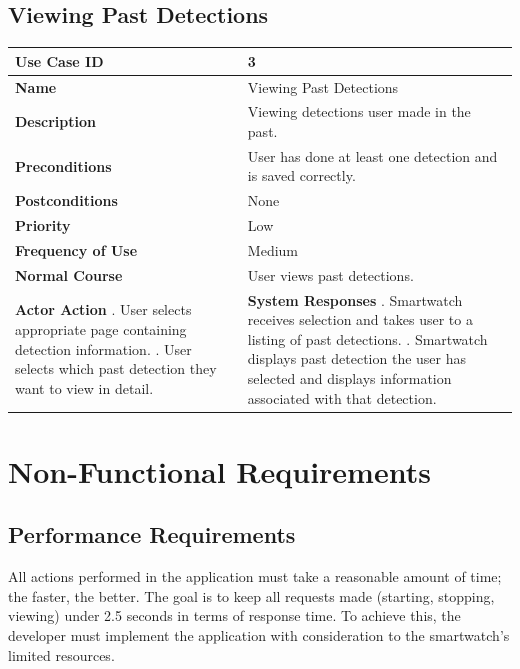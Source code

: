 \documentclass[12pt]{article}
\begin{document}
\subsection{Viewing Past Detections}
\begin{center}  
  \begin{tabular}{ |p{2.5in}|p{3in}| }
  \hline
  \textbf{Use Case ID} & 3 \\[.25in] 
  \hline
  \textbf{Name} & Viewing Past Detections \\[.25in] 
  \hline 
  \textbf{Description} & Viewing detections user made in the past. \\[.25in] 
  \hline 
  \textbf{Preconditions} & 
     User has done at least one detection and is saved correctly. \\
  \hline
  \textbf{Postconditions} & None \\[.25in] 
  \hline
  \textbf{Priority} & Low \\[.25in] 
  \hline 
  \textbf{Frequency of Use} & Medium \\[.25in] 
  \hline 
  \textbf{Normal Course} & User views past detections. \\[.25in] 
  \hline 
  \textbf{Actor Action} \newline \newline 
  1. User selects appropriate page containing detection information. \newline \newline
  3. User selects which past detection they want to view in detail. \newline
  & \textbf{System Responses} \newline \newline
  2. Smartwatch receives selection and takes user to a listing of past detections. \newline \newline
  4. Smartwatch displays past detection the user has selected and displays information associated with that detection. \\[.25in] 
  \hline
  \end{tabular}
\end{center}

\section{Non-Functional Requirements}
\subsection{Performance Requirements}
All actions performed in the application must take a reasonable amount of time; the faster, the better. The goal is to keep all requests made (starting, stopping, viewing) under 2.5 seconds in terms of response time. To achieve this, the developer must implement the application with consideration to the smartwatch's limited resources.
\end{document}
